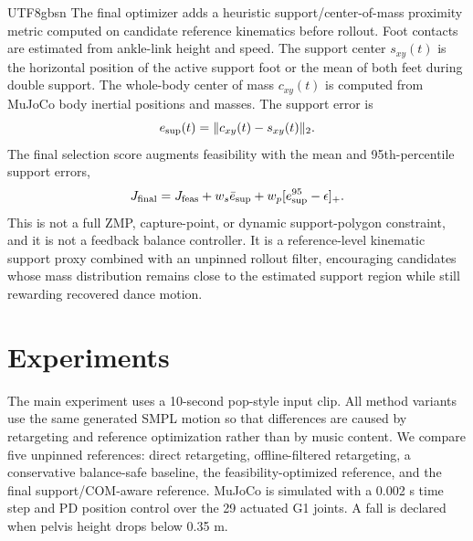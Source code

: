 \documentclass[conference]{IEEEtran}
\begin{document}
\begin{CJK*}{UTF8}{gbsn}
The final optimizer adds a heuristic support/center-of-mass proximity metric computed on candidate reference kinematics before rollout. Foot contacts are estimated from ankle-link height and speed. The support center $s_{xy}(t)$ is the horizontal position of the active support foot or the mean of both feet during double support. The whole-body center of mass $c_{xy}(t)$ is computed from MuJoCo body inertial positions and masses. The support error is
\begin{equation}
e_{\rm sup}(t)=\|c_{xy}(t)-s_{xy}(t)\|_2.
\end{equation}
The final selection score augments feasibility with the mean and 95th-percentile support errors,
\begin{equation}
J_{\rm final}=J_{\rm feas}+w_s\bar e_{\rm sup}+w_p[e_{\rm sup}^{95}-\epsilon]_+.
\end{equation}
This is not a full ZMP, capture-point, or dynamic support-polygon constraint, and it is not a feedback balance controller. It is a reference-level kinematic support proxy combined with an unpinned rollout filter, encouraging candidates whose mass distribution remains close to the estimated support region while still rewarding recovered dance motion.

\section{Experiments}
The main experiment uses a 10-second pop-style input clip. All method variants use the same generated SMPL motion so that differences are caused by retargeting and reference optimization rather than by music content. We compare five unpinned references: direct retargeting, offline-filtered retargeting, a conservative balance-safe baseline, the feasibility-optimized reference, and the final support/COM-aware reference. MuJoCo is simulated with a 0.002 s time step and PD position control over the 29 actuated G1 joints. A fall is declared when pelvis height drops below 0.35 m.


\end{CJK*}
\end{document}
